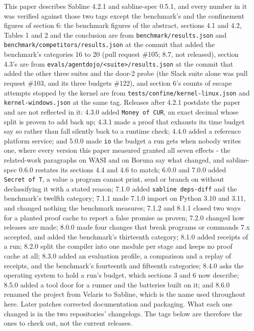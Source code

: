 \documentclass[
]{article}
\begin{document}
This paper describes Sabline 4.2.1 and sabline-spec 0.5.1, and every
number in it was verified against those two tags except the benchmark's
and the confinement figures of section 6: the benchmark figures of the
abstract, sections 4.1 and 4.2, Tables 1 and 2 and the conclusion are
from \texttt{benchmark/results.json} and
\texttt{benchmark/competitors/results.json} at the commit that added the
benchmark's categories 16 to 20 (pull request \#105; 8.7, not released),
section 4.3's are from
\texttt{evals/agentdojo/\textless{}suite\textgreater{}/results.json} at
the commit that added the other three suites and the door-2 probe (the
Slack suite alone was pull request \#103, and its three budgets \#122),
and section 6's counts of escape attempts stopped by the kernel are from
\texttt{tests/confine/kernel-linux.json} and
\texttt{kernel-windows.json} at the same tag. Releases after 4.2.1
postdate the paper and are not reflected in it: 4.3.0 added
\texttt{Money\ of\ CUR}, an exact decimal whose split is proven to add
back up; 4.3.1 made a proof that exhausts its time budget say so rather
than fall silently back to a runtime check; 4.4.0 added a reference
platform service; and 5.0.0 made \texttt{io} the budget a run gets when
nobody writes one, where every version this paper measured granted all
seven effects - the related-work paragraphs on WASI and on Boruna say
what changed, and sabline-spec 0.6.0 restates its sections 4.4 and 4.6
to match; 6.0.0 and 7.0.0 added \texttt{Secret\ of\ T}, a value a
program cannot print, send or branch on without declassifying it with a
stated reason; 7.1.0 added \texttt{sabline\ deps-diff} and the
benchmark's twelfth category; 7.1.1 made 7.1.0 import on Python 3.10 and
3.11, and changed nothing the benchmark measures; 7.1.2 and 8.1.1 closed
two ways for a planted proof cache to report a false promise as proven;
7.2.0 changed how releases are made; 8.0.0 made four changes that break
programs or commands 7.x accepted, and added the benchmark's thirteenth
category; 8.1.0 added receipts of a run; 8.2.0 split the compiler into
one module per stage and keeps no proof cache at all; 8.3.0 added an
evaluation profile, a comparison and a replay of receipts, and the
benchmark's fourteenth and fifteenth categories; 8.4.0 asks the
operating system to hold a run's budget, which sections 3 and 6 now
describe; 8.5.0 added a tool door for a runner and the batteries built
on it; and 8.6.0 renamed the project from Velaris to Sabline, which is
the name used throughout here. Later patches corrected documentation and
packaging. What each one changed is in the two repositories' changelogs.
The tags below are therefore the ones to check out, not the current
releases.
\end{document}
